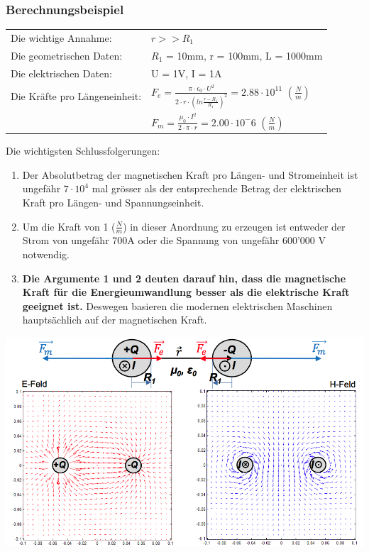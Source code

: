 \subsubsection{Berechnungsbeispiel}
\begin{tabular}{ll}
Die wichtige Annahme: & $r >> R_1$ \\
Die geometrischen Daten: & $R_{1}$ = 10mm, r = 100mm, L = 1000mm\\
Die elektrischen Daten:& U = 1V, I = 1A  \\
Die Kräfte pro Längeneinheit: &$F_{e} = \frac{\pi \cdot \epsilon_{0} \cdot U^{2}}{2 \cdot r \cdot (ln\frac{r-R_{1}}{R_{1}})^{2}} = 2.88 \cdot 10^{11}$ $(\frac{N}{m})$ \\
&$F_{m} = \frac{\mu_{0} \cdot I^{2}}{2 \cdot \pi \cdot r} = 2.00 \cdot 10^-6$ $(\frac{N}{m})$ \\
\end{tabular}

Die wichtigsten Schlussfolgerungen:
\begin{enumerate}
\item Der Absolutbetrag der magnetischen Kraft pro Längen- und Stromeinheit ist ungefähr $7 \cdot 10^{4}$ mal grösser als der entsprechende Betrag der elektrischen Kraft pro Längen- und Spannungseinheit.
\item Um die Kraft von 1 ($\frac{N}{m}$) in dieser Anordnung zu erzeugen ist entweder der Strom von ungefähr 700A oder die Spannung von ungefähr 600'000 V notwendig. 
\item \textbf{Die Argumente 1 und 2 deuten darauf hin, dass die magnetische Kraft für die Energieumwandlung besser als die elektrische Kraft geeignet ist.} Deswegen basieren die modernen elektrischen Maschinen hauptsächlich auf der magnetischen Kraft.
\end{enumerate}
    \includegraphics[width = 0.75\linewidth]{./Pics/VL1/magKraft}
    
